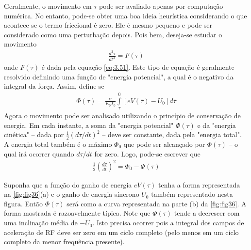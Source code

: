 Geralmente, o movimento em $\tau$ pode ser avaliado apenas por computação numérica. No entanto, pode-se obter uma boa ideia heurística considerando o que acontece se o termo friccional é zero. Ele é mesmo pequeno e pode ser considerado como uma perturbação depois. Pois bem, deseja-se estudar o movimento
\begin{align}
	\frac{d^2\tau}{dt^2} = F(\tau)
\end{align}
onde $F(\tau)$ é dada pela equação \eqref{eq:3.51}. Este tipo de equação é geralmente resolvido definindo uma função de "energia potencial", a qual é o negativo da integral da força. Assim, define-se
\begin{align}
	\Phi(\tau) = \frac{\alpha}{E_0 T_0} \int\limits_{\tau}^{0}[eV(\bar{\tau}) - U_0]d\bar{\tau}
\end{align}
Agora o movimento pode ser analisado utilizando o princípio de conservação de energia. Em cada instante, a soma da "energia potencial" $\Phi(\tau)$ e da "energia cinética" -- dada por $\frac{1}{2}(d\tau/dt)^2$ -- deve ser constante, dada pela "energia total". A energia total também é o máximo $\Phi_0$ que pode ser alcançado por $\Phi(\tau)$ -- o qual irá ocorrer quando $d\tau/dt$ for zero. Logo, pode-se escrever que
\begin{align}
	\frac{1}{2}\left(\frac{d\tau}{dt}\right)^2 = \Phi_0 - \Phi(\tau)\label{eq:3.54}
\end{align}

Suponha que a função do ganho de energia $eV(\tau)$ tenha a forma representada na \autoref{fig:fig36}(a) e o ganho de energia síncrono $U_0$ também representado nesta figura. Então $\Phi(\tau)$ será como a curva representada na parte (b) da \autoref{fig:fig36}. A forma mostrada é razoavelmente típica. Note que $\Phi(\tau)$ tende a decrescer com uma inclinação média de $-U_0$. Isto precisa ocorrer pois a integral dos campos de aceleração de RF deve ser zero em um ciclo completo (pelo menos em um ciclo completo da menor frequência presente).

